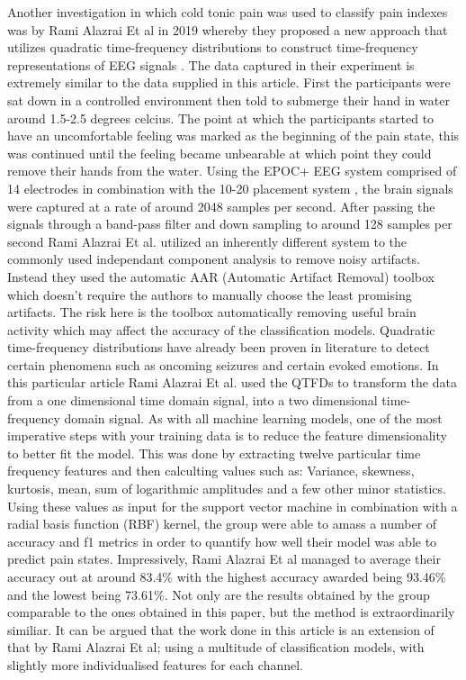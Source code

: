 \documentclass[11pt]{article}
\begin{document}
Another investigation in which cold tonic pain was used to classify pain indexes was by Rami Alazrai Et al in 2019 whereby they proposed a new approach that utilizes quadratic time-frequency distributions to construct time-frequency representations of EEG signals \cite{8941629}. The data captured in their experiment is extremely similar to the data supplied in this article. First the participants were sat down in a controlled environment then told to submerge their hand in water around 1.5-2.5 degrees celcius. The point at which the participants started to have an uncomfortable feeling was marked as the beginning of the pain state, this was continued until the feeling became unbearable at which point they could remove their hands from the water. Using the EPOC+ EEG system comprised of 14 electrodes in combination with the 10-20 placement system \cite{Herwig2003-xa}, the brain signals were captured at a rate of around 2048 samples per second. After passing the signals through a band-pass filter and down sampling to around 128 samples per second  Rami Alazrai Et al. utilized an inherently different system to the commonly used independant component analysis to remove noisy artifacts. Instead they used the automatic AAR (Automatic Artifact Removal) toolbox \cite{AAR} which doesn't require the authors to manually choose the least promising artifacts. The risk here is the toolbox automatically removing useful brain activity which may affect the accuracy of the classification models. Quadratic time-frequency distributions have already been proven in literature to detect certain phenomena such as oncoming seizures and certain evoked emotions. In this particular article Rami Alazrai Et al. used the QTFDs to transform the data from a one dimensional time domain signal, into a two dimensional time-frequency domain signal. As with all machine learning models, one of the most imperative steps with your training data is to reduce the feature dimensionality to better fit the model. This was done by extracting twelve particular time frequency features and then calculting values such as: Variance, skewness, kurtosis, mean, sum of logarithmic amplitudes and a few other minor statistics. Using these values as input for the support vector machine \cite{cortes1995support} in combination with a radial basis function (RBF) kernel, the group were able to amass a number of accuracy and f1 metrics in order to quantify how well their model was able to predict pain states. Impressively, Rami Alazrai Et al managed to average their accuracy out at around 83.4\% with the highest accuracy awarded being 93.46\% and the lowest being 73.61\%. Not only are the results obtained by the group comparable to the ones obtained in this paper, but the method is extraordinarily similiar. It can be argued that the work done in this article is an extension of that by Rami Alazrai Et al; using a multitude of classification models, with slightly more individualised features for each channel.
\end{document}
